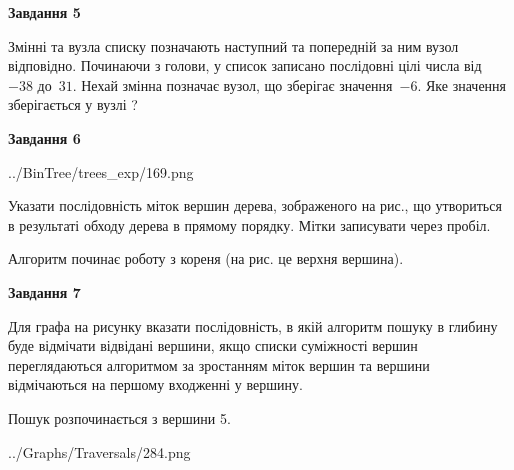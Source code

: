 \documentclass[12pt, ukrainian]{article}
\begin{document}
{\begin {large}
{\begin {center}\textbf{Завдання 5}\end {center}}\par
Змінні  та  вузла списку позначають наступний та попередній за ним вузол відповідно. Починаючи з голови, у список записано послідовні цілі числа від~$-38$ до~$31$. Нехай змінна  позначає вузол, що зберігає значення~$-6$.
Яке значення зберігається у вузлі  ?\par
\newpage

{\begin {center}\textbf{Завдання 6}\end {center}}\par

\begin{center}
	{../BinTree/trees_exp/169.png}
\end{center}
Указати послідовність міток вершин дерева, зображеного на рис., що утвориться в результаті обходу дерева в прямому порядку. Мітки записувати через пробіл.\par Алгоритм починає роботу з кореня (на рис. це верхня вершина).\par
\newpage

{\begin {center}\textbf{Завдання 7}\end {center}}\par
Для графа на рисунку вказати послідовність, в якій алгоритм пошуку в глибину буде відмічати відвідані вершини, якщо списки суміжності вершин переглядаються алгоритмом за зростанням міток вершин та вершини відмічаються на першому вход\-женні у вершину.\par
Пошук розпочинається з вершини 5.\par

\begin{center}
	{../Graphs/Traversals/284.png}
\end{center}\par
\newpage


\end{large}}
\end{document}
